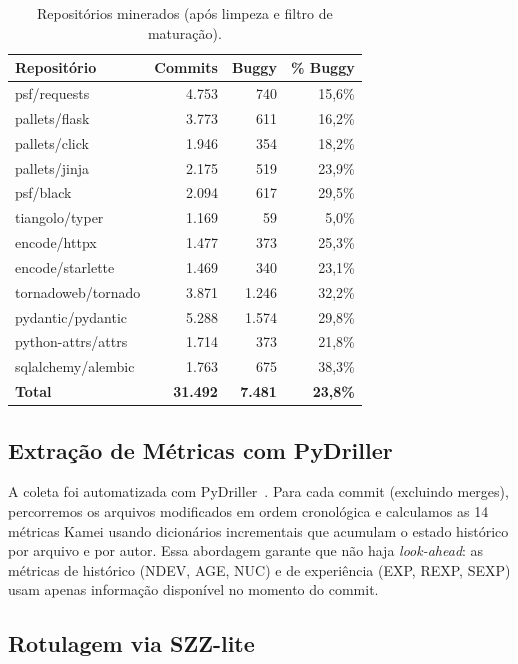 \documentclass[12pt]{article}
\begin{document}
\begin{table}[H]
\centering
\caption{Repositórios minerados (após limpeza e filtro de maturação).}
\label{tab:repos}
\small
\begin{tabular}{lrrr}
\toprule
\textbf{Repositório} & \textbf{Commits} & \textbf{Buggy} & \textbf{\% Buggy} \\
\midrule
psf/requests        & 4.753 &   740 & 15,6\% \\
pallets/flask       & 3.773 &   611 & 16,2\% \\
pallets/click       & 1.946 &   354 & 18,2\% \\
pallets/jinja       & 2.175 &   519 & 23,9\% \\
psf/black           & 2.094 &   617 & 29,5\% \\
tiangolo/typer      & 1.169 &    59 &  5,0\% \\
encode/httpx        & 1.477 &   373 & 25,3\% \\
encode/starlette    & 1.469 &   340 & 23,1\% \\
tornadoweb/tornado  & 3.871 & 1.246 & 32,2\% \\
pydantic/pydantic   & 5.288 & 1.574 & 29,8\% \\
python-attrs/attrs  & 1.714 &   373 & 21,8\% \\
sqlalchemy/alembic  & 1.763 &   675 & 38,3\% \\
\midrule
\textbf{Total}      & \textbf{31.492} & \textbf{7.481} & \textbf{23,8\%} \\
\bottomrule
\end{tabular}
\end{table}

\subsection{Extração de Métricas com PyDriller}

A coleta foi automatizada com PyDriller~\cite{spadini2018}.
Para cada commit (excluindo merges), percorremos os arquivos modificados em ordem
cronológica e calculamos as 14 métricas Kamei usando dicionários incrementais que
acumulam o estado histórico por arquivo e por autor. Essa abordagem garante que não
haja \textit{look-ahead}: as métricas de histórico (NDEV, AGE, NUC) e de experiência
(EXP, REXP, SEXP) usam apenas informação disponível no momento do commit.

\subsection{Rotulagem via SZZ-lite}
\end{document}

